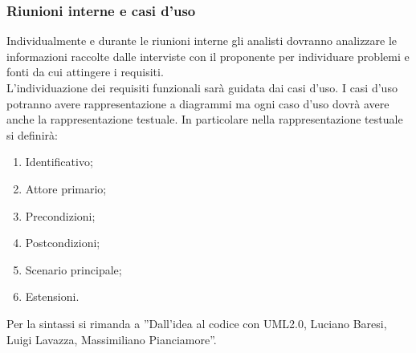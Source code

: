 {{			\subsubsection{Riunioni interne e casi d'uso}
			Individualmente e durante le riunioni interne gli analisti dovranno analizzare le informazioni raccolte dalle interviste con il proponente per individuare problemi e fonti da cui attingere i requisiti.\\
			L’individuazione dei requisiti funzionali sarà guidata dai casi d’uso. I casi d’uso potranno avere rappresentazione a diagrammi ma ogni caso d’uso dovrà avere anche la rappresentazione testuale. In particolare nella rappresentazione testuale si definirà:
			\begin{enumerate}
				\item Identificativo;
				\item Attore primario;
				\item Precondizioni;
				\item Postcondizioni;
				\item Scenario principale;
				\item Estensioni.
			\end{enumerate}
			Per la sintassi si rimanda a ”Dall’idea al codice con UML2.0, Luciano Baresi, Luigi Lavazza, Massimiliano Pianciamore”.
			}
}
